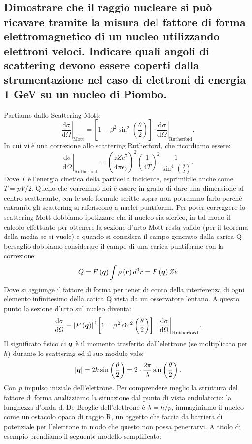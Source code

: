 \subsection{Dimostrare che il raggio nucleare si può ricavare tramite la misura del fattore di forma elettromagnetico di un nucleo utilizzando elettroni veloci. Indicare quali angoli di scattering devono essere coperti dalla strumentazione nel caso di elettroni di energia 1 GeV su un nucleo di Piombo.}%
\label{sec:5.c.36}
Partiamo dallo Scattering Mott:
\[
	\left.\frac{\mbox{d}\sigma }{\mbox{d} \Omega} \right|_{\text{Mott}} = 
		\left[ 1- \beta^2 \sin^2\left( \frac{\theta}{2} \right) \right]\cdot \left.\frac{\mbox{d} \sigma}{\mbox{d} \Omega} \right|_{\text{Rutherford}} 
.\] 
In cui vi è una correzione allo scattering Rutherford, che ricordiamo essere:
\[
	\left.\frac{\mbox{d} \sigma}{\mbox{d} \Omega} \right|_{\text{Rutherford}}= \left( \frac{zZe^2}{4\pi\epsilon_0} \right)^2\left( \frac{1}{4T} \right)^2 
		\frac{1}{\sin^4\left( \frac{\theta}{2} \right) }
.\] 
Dove $T$ è l'energia cinetica della particella incidente, esprimibile anche come $T = pV /2$.
Quello che vorremmo noi è essere in grado di dare una dimensione al centro scatterante, con le sole formule scritte sopra non potremmo farlo perchè entrambi gli scattering si riferiscono a nuclei puntiformi. Per poter correggere lo scattering Mott dobbiamo ipotizzare che il nucleo sia sferico, in tal modo il calcolo effettuato per ottenere la sezione d'urto Mott resta valido (per il teorema della media se si vuole) e quando si considera il campo generato dalla carica Q bersaglio dobbiamo considerare il campo di una carica puntiforme con la correzione: 
\[
	Q = F\left(\boldsymbol{q}\right)\int\rho\left(\boldsymbol{r}\right)d^3r = F\left(\boldsymbol{q}\right) Ze 
\]
Dove si aggiunge il fattore di forma per tener di conto della interferenza di ogni elemento infinitesimo della carica Q vista da un osservatore lontano. A questo punto la sezione d'urto sul nucleo diventa:
\[
	\frac{\mbox{d} \sigma}{\mbox{d} \Omega} =
		\left| F\left( \boldsymbol{q} \right)  \right|^2\left[ 1- \beta^2\sin^2\left( \frac{\theta}{2} \right)  \right]
		\cdot \left.\frac{\mbox{d} \sigma}{\mbox{d} \Omega} \right|_{\text{Rutherford}}
.\] 
Il significato fisico di $\boldsymbol{q}$ è il momento trasferito dall'elettrone (se moltiplicato per $\hbar$) durante lo scattering ed il suo modulo vale:
\[
	\left|\boldsymbol{q}\right|= 2k\sin\left(\frac{\theta}{2}\right)= 2\cdot \frac{2\pi}{\lambda}\sin\left( \frac{\theta}{2} \right) 
.\] 
Con $p$ impulso iniziale dell'elettrone. Per comprendere meglio la struttura del fattore di forma analizziamo la situazione dal punto di vista ondulatorio: la lunghezza d'onda di De Broglie dell'elettrone è $\lambda = h /p$, immaginiamo il nucleo come un ostacolo opaco di raggio R, un oggetto che faccia da barriera di potenziale per l'elettrone in modo che questo non possa penetrarvi. A titolo di esempio prendiamo il seguente modello semplificato:

